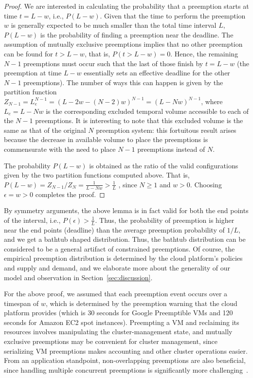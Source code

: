 \begin{proof}
We are interested in calculating the probability that a preemption starts at time $t=L-w$, i.e., $P(L-w)$. Given that the time to perform the preemption $w$ is generally expected to be much smaller than the total time interval $L$, $P(L-w)$ is the probability of finding a preemption near the deadline. The assumption of mutually exclusive preemptions implies that no other preemption can be found for $t > L - w$, that is, $P(t> L-w) = 0$. Hence, the remaining $N-1$ preemptions must occur such that the last of those finish by $t=L-w$ (the preemption at time $L-w$ essentially sets an effective deadline for the other $N-1$ preemptions). The number of ways this can happen is given by the partition function $Z_{N-1} = L_e^{N-1}= (L-2w - (N-2)w)^{N-1} = (L - Nw)^{N-1}$, where $L_e = L - Nw$ is the corresponding excluded temporal volume accessible to each of the $N-1$ preemptions.
It is interesting to note that this excluded volume
is the same as that of the original $N$ preemption system: this fortuitous result arises because the decrease in available volume to place the preemptions is commensurate with the need to place $N-1$ preemptions instead of $N$.

The probability $P(L-w)$ is obtained as the ratio of the valid configurations given by the two partition functions computed above.
That is, 
$P(L-w) = Z_{N-1}/ {Z_N} = \frac{1}{L - Nw} > \frac{1}{L}$ , since $N \geq 1$ and $w>0$. Choosing $\epsilon = w > 0$ completes the proof.
\end{proof}

By symmetry arguments, the above lemma is in fact valid for both the end points of the interval, i.e., $P(\epsilon) > \frac{1}{L}$.
Thus, the probability of preemption is higher near the end points (deadline) than the average preemption probability of $1/L$, and we get a bathtub shaped distribution.
Thus, the bathtub distribution can be considered to be a general artifact of constrained preemptions. Of course, the empirical preemption distribution is determined by the cloud platform's policies and supply and demand, and we elaborate more about the generality of our model and observation in Section~\ref{sec:discussion}. 


For the above proof, we assumed that each preemption event occurs over a timespan of $w$, which is determined by the preemption warning that the cloud platform provides (which is 30 seconds for Google Preemptible VMs and 120 seconds for Amazon EC2 spot instances). 
Preempting a VM and reclaiming its resources involves manipulating the cluster-management state, and mutually exclusive preemptions may be convenient for cluster management, since serializing VM preemptions makes accounting and other cluster operations easier.
From an application standpoint, non-overlapping preemptions are also beneficial, since handling multiple concurrent preemptions is significantly more challenging~\cite{exosphere}. 


